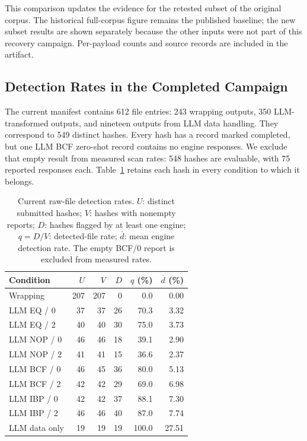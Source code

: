 This comparison updates the evidence for the retested subset of the original
corpus. The historical full-corpus figure remains the published baseline;
the new subset results are shown separately because the other inputs were
not part of this recovery campaign. Per-payload counts and source records
are included in the artifact.



\subsection{Detection Rates in the Completed Campaign}
The current manifest contains 612 file entries: 243 wrapping outputs,
350 LLM-transformed outputs, and nineteen outputs from LLM data handling.
They correspond to 549 distinct hashes. Every hash has a record marked
completed, but one LLM BCF zero-shot record contains no engine responses.
We exclude that empty result from measured scan rates: 548 hashes are
evaluable, with 75 reported responses each. Table~\ref{tab:current_scans}
retains each hash in every condition to which it belongs.


\begin{table}[t]
\caption{Current raw-file detection rates. $U$: distinct submitted hashes;
$V$: hashes with nonempty reports; $D$: hashes flagged by at least one
engine; $q=D/V$: detected-file rate; $\overline d$: mean engine detection
rate. The empty BCF/0 report is excluded from measured rates.}
\label{tab:current_scans}
\centering\small\setlength{\tabcolsep}{4pt}
\begin{tabular}{@{}lrrrrr@{}}
\toprule
Condition & $U$ & $V$ & $D$ & $q$ (\%) & $\overline d$ (\%) \\
\midrule
Wrapping & 207 & 207 & 0 & 0.0 & 0.00 \\
LLM EQ / 0 & 37 & 37 & 26 & 70.3 & 3.32 \\
LLM EQ / 2 & 40 & 40 & 30 & 75.0 & 3.73 \\
LLM NOP / 0 & 46 & 46 & 18 & 39.1 & 2.90 \\
LLM NOP / 2 & 41 & 41 & 15 & 36.6 & 2.37 \\
LLM BCF / 0 & 46 & 45 & 36 & 80.0 & 5.13 \\
LLM BCF / 2 & 42 & 42 & 29 & 69.0 & 6.98 \\
LLM IBP / 0 & 42 & 42 & 37 & 88.1 & 7.30 \\
LLM IBP / 2 & 46 & 46 & 40 & 87.0 & 7.74 \\
LLM data only & 19 & 19 & 19 & 100.0 & 27.51 \\
\bottomrule
\end{tabular}
\end{table}



